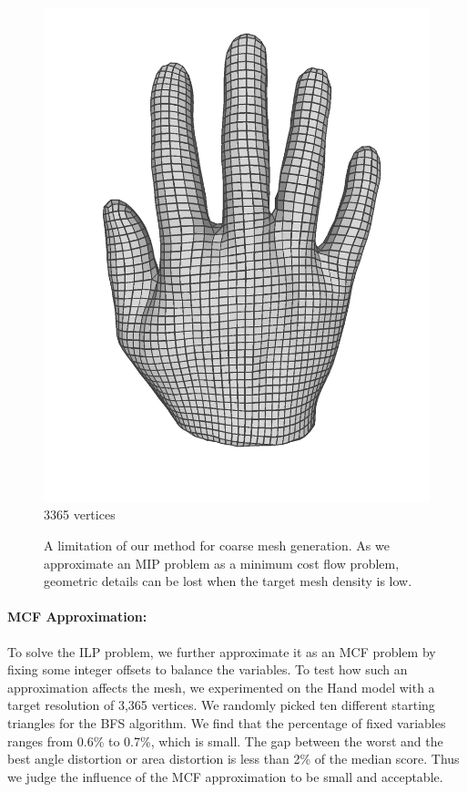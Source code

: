 \begin{figure}
\begin{minipage}{0.24\linewidth}
\includegraphics[width=\linewidth]{quadriflow/evaluation/coarse04.png}
3365 vertices
\end{minipage}
\caption{A limitation of our method for coarse mesh generation. As we approximate an MIP problem as a minimum cost flow problem, geometric details can be lost when the target mesh density is low.}
\label{fig:quad-coarse}
\end{figure}

\paragraph*{MCF Approximation:} To solve the ILP problem, we further approximate it as an MCF problem by fixing some integer offsets to balance the variables.  To test how such an approximation affects the mesh, we experimented on the Hand model with a target resolution of 3,365 vertices. We randomly picked ten different starting triangles for the BFS algorithm.  We find that the percentage of fixed variables ranges from 0.6\% to 0.7\%, which is small. The gap between the worst and the best angle distortion or area distortion is less than 2\% of the median score. Thus we judge the influence of the MCF approximation to be small and acceptable.

